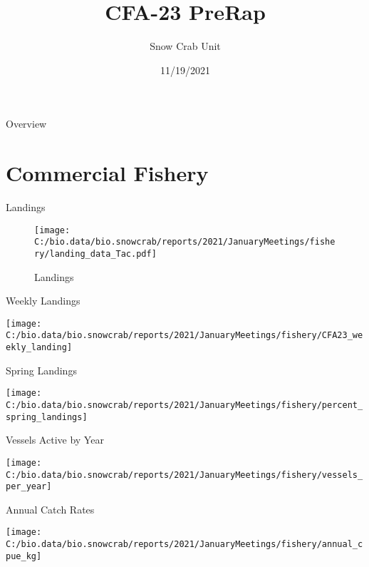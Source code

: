 \documentclass[
  ignorenonframetext,
]{beamer}
\title{CFA-23 PreRap}
\author{Snow Crab Unit}
\date{11/19/2021}
\begin{document}
\frame{\titlepage}

\begin{frame}{Overview}
\protect\hypertarget{overview}{}
\end{frame}

\hypertarget{commercial-fishery}{%
\section{Commercial Fishery}\label{commercial-fishery}}

\begin{frame}{Landings}
\protect\hypertarget{landings}{}
\begin{figure}
\centering
\texttt{[image: C:/bio.data/bio.snowcrab/reports/2021/JanuaryMeetings/fishery/landing\_data\_Tac.pdf]}
\caption{Landings}
\end{figure}
\end{frame}

\begin{frame}{Weekly Landings}
\protect\hypertarget{weekly-landings}{}
\begin{center}\texttt{[image: C:/bio.data/bio.snowcrab/reports/2021/JanuaryMeetings/fishery/CFA23\_weekly\_landing]} \end{center}
\end{frame}

\begin{frame}{Spring Landings}
\protect\hypertarget{spring-landings}{}
\begin{center}\texttt{[image: C:/bio.data/bio.snowcrab/reports/2021/JanuaryMeetings/fishery/percent\_spring\_landings]} \end{center}
\end{frame}

\begin{frame}{Vessels Active by Year}
\protect\hypertarget{vessels-active-by-year}{}
\begin{center}\texttt{[image: C:/bio.data/bio.snowcrab/reports/2021/JanuaryMeetings/fishery/vessels\_per\_year]} \end{center}
\end{frame}

\begin{frame}{Annual Catch Rates}
\protect\hypertarget{annual-catch-rates}{}
\begin{center}\texttt{[image: C:/bio.data/bio.snowcrab/reports/2021/JanuaryMeetings/fishery/annual\_cpue\_kg]} \end{center}
\end{frame}
\end{document}
